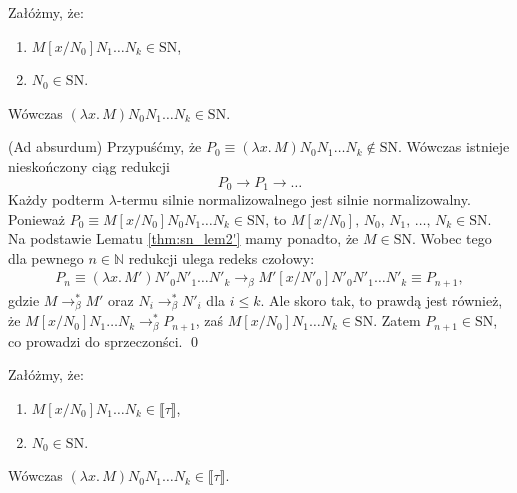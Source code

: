 \begin{lemat}\label{thm:sn_lemat2}
  Załóżmy, że:
  \begin{enumerate}[label=(\alph*)]
    \setlength\itemsep{0em}
    \item  \(M[x/N_0]N_1\dots N_k\in\mathrm{SN}\),\label{def:l2_a}
    \item  \(N_0\in \mathrm{SN}\).\label{def:l2_b}
  \end{enumerate}
  Wówczas \((\lambda x.\,M)N_0 N_1 \dots N_k \in \mathrm{SN}\).
\end{lemat}
\begin{dowod}
  (Ad  absurdum) Przypuśćmy,  że  \(P_0\equiv(\lambda  x.\, M)N_0  N_1
  \dots N_k \not\in\mathrm{SN}\). Wówczas istnieje nieskończony ciąg redukcji
  \[
    P_0\to P_1 \to \dots
  \]
  Każdy podterm \(\lambda\)-termu silnie normalizowalnego jest silnie
  normalizowalny. Ponieważ \(P_0\equiv M[x/N_0]N_0  N_1 \dots N_k
  \in\mathrm{SN}\), to \(M[x/N_0],\,N_0,\,  N_1,\, \dots,\, N_k
  \in\mathrm{SN}\). Na podstawie Lematu \ref{thm:sn_lem2'} mamy ponadto, że \(M\in\mathrm{SN}\). Wobec tego dla pewnego \(n\in\mathbb{N}\) redukcji ulega redeks czołowy:
  \begin{align*}
    P_n\equiv (\lambda x.\,M')N'_0 N'_1 \dots N'_k\to_\beta M'[x/N'_0]N'_0 N'_1\dots N'_k\equiv P_{n+1},
  \end{align*}
    gdzie \(M\to^{*}_\beta M'\) oraz \(N_i \to^{*}_\beta N'_i\) dla \(i\leq k\). Ale skoro tak, to prawdą jest również, że \(M[x/N_0]N_1\dots N_k \to^{*}_\beta P_{n+1}\), zaś \(M[x/N_0]N_1\dots N_k \in \mathrm{SN}\). Zatem \(P_{n+1}\in\mathrm{SN}\), co prowadzi do sprzeczonści.
  \qed
\end{dowod}
\begin{lemat}\label{thm:sn_lemat3}
  Załóżmy, że:
  \begin{enumerate}[label=(\alph*)]
    \setlength\itemsep{0em}
    \item  \(M[x/N_0]N_1\dots N_k\in \llbracket \tau \rrbracket\),\label{def:l3_a}
    \item  \(N_0\in \mathrm{SN}\).\label{def:l3_b}
  \end{enumerate}
  Wówczas \((\lambda x.\,M)N_0 N_1 \dots N_k \in \llbracket \tau \rrbracket \).
\end{lemat}
